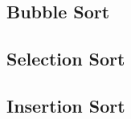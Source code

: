 \documentclass[../algorytmy.tex]{subfiles}
\begin{document}
    \subsection{Bubble Sort}
    
    \pagebreak

    \subsection{Selection Sort}
    
    \pagebreak

    \subsection{Insertion Sort}
    
    \pagebreak
\end{document}
